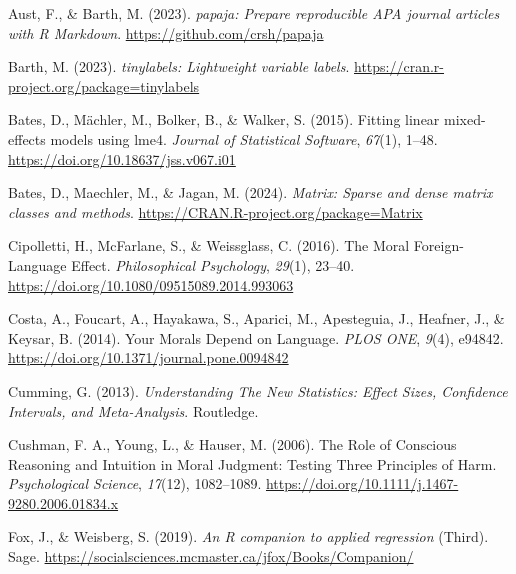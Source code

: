 \documentclass[
  man,floatsintext]{apa7}
\newlength{\cslhangindent}
\newlength{\cslentryspacingunit} %
\newenvironment{CSLReferences}[2] %
 {%
  \setlength{\parindent}{0pt}
  \ifodd #1
  \let\oldpar\par
  \def\par{\hangindent=\cslhangindent\oldpar}
  \fi
  \setlength{\parskip}{#2\cslentryspacingunit}
 }%
 {}
\begin{document}
\hypertarget{refs}{}
\begin{CSLReferences}{1}{0}
\leavevmode{}%
Aust, F., \& Barth, M. (2023). \emph{{papaja}: {Prepare} reproducible {APA} journal articles with {R Markdown}}. \url{https://github.com/crsh/papaja}

\leavevmode{}%
Barth, M. (2023). \emph{{tinylabels}: Lightweight variable labels}. \url{https://cran.r-project.org/package=tinylabels}

\leavevmode{}%
Bates, D., Mächler, M., Bolker, B., \& Walker, S. (2015). Fitting linear mixed-effects models using {lme4}. \emph{Journal of Statistical Software}, \emph{67}(1), 1--48. \url{https://doi.org/10.18637/jss.v067.i01}

\leavevmode{}%
Bates, D., Maechler, M., \& Jagan, M. (2024). \emph{Matrix: Sparse and dense matrix classes and methods}. \url{https://CRAN.R-project.org/package=Matrix}

\leavevmode{}%
Cipolletti, H., McFarlane, S., \& Weissglass, C. (2016). The {Moral Foreign-Language Effect}. \emph{Philosophical Psychology}, \emph{29}(1), 23--40. \url{https://doi.org/10.1080/09515089.2014.993063}

\leavevmode{}%
Costa, A., Foucart, A., Hayakawa, S., Aparici, M., Apesteguia, J., Heafner, J., \& Keysar, B. (2014). Your {Morals Depend} on {Language}. \emph{PLOS ONE}, \emph{9}(4), e94842. \url{https://doi.org/10.1371/journal.pone.0094842}

\leavevmode{}%
Cumming, G. (2013). \emph{Understanding {The New Statistics}: {Effect Sizes}, {Confidence Intervals}, and {Meta-Analysis}}. {Routledge}.

\leavevmode{}%
Cushman, F. A., Young, L., \& Hauser, M. (2006). The {Role} of {Conscious Reasoning} and {Intuition} in {Moral Judgment}: {Testing Three Principles} of {Harm}. \emph{Psychological Science}, \emph{17}(12), 1082--1089. \url{https://doi.org/10.1111/j.1467-9280.2006.01834.x}

\leavevmode{}%
Fox, J., \& Weisberg, S. (2019). \emph{An {R} companion to applied regression} (Third). Sage. \url{https://socialsciences.mcmaster.ca/jfox/Books/Companion/}


\end{CSLReferences}
\end{document}
